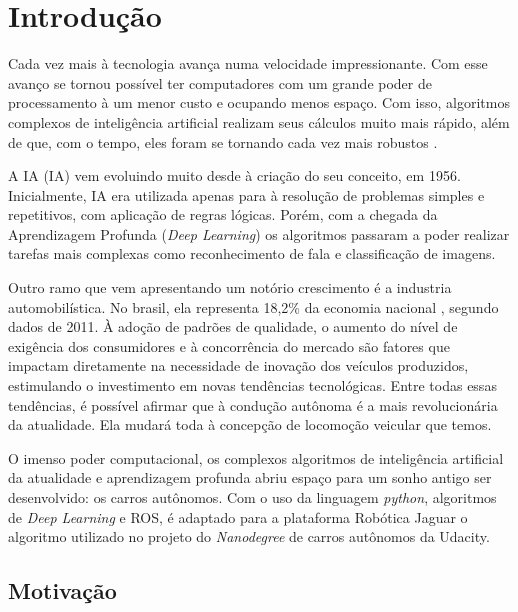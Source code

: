 \chapter{Introdução}
\label{cap:introducao}

Cada vez mais à tecnologia avança numa velocidade impressionante. Com esse avanço se tornou possível ter computadores com um grande poder de processamento à um menor custo e ocupando menos espaço. Com isso, algoritmos complexos de inteligência artificial realizam seus cálculos muito mais rápido, além de que, com o tempo, eles foram se tornando cada vez mais robustos \cite{rodrigues2017fundamentos}. 

A \acrlong{IA} (IA) vem evoluindo muito desde à criação do seu conceito, em 1956. Inicialmente, IA era utilizada apenas para à resolução de problemas simples e repetitivos, com aplicação de regras lógicas. Porém, com a chegada da Aprendizagem Profunda (\textit{Deep Learning}) os algoritmos passaram a poder realizar tarefas mais complexas como reconhecimento de fala e classificação de imagens. \cite{goodfellow2016deep}

Outro ramo que vem apresentando um notório crescimento é a industria automobilística. No brasil, ela representa 18,2\% da economia nacional \cite{estadao}, segundo dados de 2011. À adoção de padrões de qualidade, o aumento do nível de exigência dos consumidores e à concorrência do mercado são fatores que impactam diretamente na necessidade de inovação dos veículos produzidos, estimulando o investimento em novas tendências tecnológicas. Entre todas essas tendências, é possível afirmar que à condução autônoma é a mais revolucionária da atualidade. Ela mudará toda à concepção de locomoção veicular que temos. \cite{rodrigues2017fundamentos}

O imenso poder computacional, os complexos algoritmos de inteligência artificial da atualidade e aprendizagem profunda abriu espaço para um sonho antigo ser desenvolvido: os carros autônomos. 
Com o uso da linguagem \textit{python}, algoritmos de \textit{Deep Learning} e ROS, é adaptado para a plataforma Robótica Jaguar o algoritmo utilizado no projeto do \textit{Nanodegree} de carros autônomos da Udacity.

\section{Motivação}
\label{sec:motivacao}

